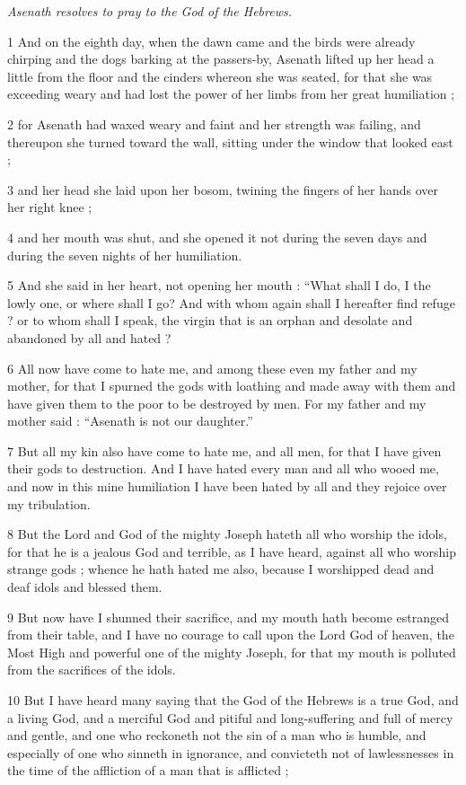 \par \textit{Asenath resolves to pray to the God of the Hebrews.}

1 And on the eighth day, when the dawn came and the birds were already chirping and the dogs barking at the passers-by, Asenath lifted up her head a little from the floor and the cinders whereon she was seated, for that she was exceeding weary and had lost the power of her limbs from her great humiliation ; 

2 for Asenath had waxed weary and faint and her strength was failing, and thereupon she turned toward the wall, sitting under the window that looked east ; 

3 and her head she laid upon her bosom, twining the fingers of her hands over her right knee ; 

4 and her mouth was shut, and she opened it not during the seven days and during the seven nights of her humiliation. 

5 And she said in her heart, not opening her mouth : “What shall I do, I the lowly one, or where shall I go? And with whom again shall I hereafter find refuge ? or to whom shall I speak, the virgin that is an orphan and desolate and abandoned by all and hated ? 

6 All now have come to hate me, and among these even my father and my mother, for that I spurned the gods with loathing and made away with them and have given them to the poor to be destroyed by men. For my father and my mother said : “Asenath is not our daughter.” 

7 But all my kin also have come to hate me, and all men, for that I have given their gods to destruction. And I have hated every man and all who wooed me, and now in this mine humiliation I have been hated by all and they rejoice over my tribulation. 

8 But the Lord and God of the mighty Joseph hateth all who worship the idols, for that he is a jealous God and terrible, as I have heard, against all who worship strange gods ; whence he hath hated me also, because I worshipped dead and deaf idols and blessed them. 

9 But now have I shunned their sacrifice, and my mouth hath become estranged from their table, and I have no courage to call upon the Lord God of heaven, the Most High and powerful one of the mighty Joseph, for that my mouth is polluted from the sacrifices of the idols. 

10 But I have heard many saying that the God of the Hebrews is a true God, and a living God, and a merciful God and pitiful and long-suffering and full of mercy and gentle, and one who reckoneth not the sin of a man who is humble, and especially of one who sinneth in ignorance, and convicteth not of lawlessnesses in the time of the affliction of a man that is afflicted ; 

